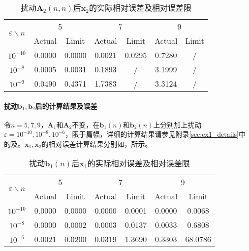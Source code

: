 \documentclass[12pt,a4paper]{article}
\begin{document}
\begin{table}
    \centering
    \caption{扰动$\boldsymbol{A}_2(n,n)$后$\boldsymbol{x}_2$的实际相对误差及相对误差限}
    \label{tab:ex1_err2}
    \begin{tabular}{c|cc|cc|cc}
        \toprule
        \multirow{2}{*}{\(\varepsilon \backslash n\)} & \multicolumn{2}{c}{5} & \multicolumn{2}{|c}{7} & \multicolumn{2}{|c}{9}\tabularnewline
        \cline{2-7}
        & Actual & Limit & Actual & Limit & Actual & Limit\tabularnewline
        \midrule
        \(10^{-10}\) & 0.0000 & 0.0000 & 0.0021 & 0.0295 & 0.7280 &
        /\tabularnewline
        \(10^{-8}\) & 0.0005 & 0.0031 & 0.1893 & / & 3.1999 & /\tabularnewline
        \(10^{-6}\) & 0.0490 & 0.4371 & 1.7383 & / & 3.3124 & /\tabularnewline
        \bottomrule
    \end{tabular}
\end{table}

\paragraph{扰动$\boldsymbol{b}_1,\boldsymbol{b}_2$后的计算结果及误差} 令$n=5,7,9$，$\boldsymbol{A}_1$和$\boldsymbol{A}_2$不变，在$\boldsymbol{b}_1(n)$和$\boldsymbol{b}_2(n)$上分别加上扰动$\varepsilon=10^{-10},10^{-8},10^{-6}$，限于篇幅，详细的计算结果请参见附录\ref{sec:ex1_details}中的及。$\boldsymbol{x}_1,\boldsymbol{x}_2$的相对误差计算结果分别如，所示。

\begin{table}
    \centering
    \caption{扰动$\boldsymbol{b}_1(n)$后$\boldsymbol{x}_1$的实际相对误差及相对误差限}
    \label{tab:ex1_b1_err}
    \begin{tabular}{c|cc|cc|cc}
        \toprule
        \multirow{2}{*}{\(\varepsilon \backslash n\)} & \multicolumn{2}{c}{5} & \multicolumn{2}{|c}{7} & \multicolumn{2}{|c}{9}\tabularnewline
        \cline{2-7}
        & Actual & Limit & Actual & Limit & Actual & Limit\tabularnewline
        \midrule
        \(10^{-10}\) & 0.0000 & 0.0000 & 0.0000 & 0.0001 & 0.0000 &
        0.0068\tabularnewline
        \(10^{-8}\) & 0.0000 & 0.0002 & 0.0003 & 0.0137 & 0.0033 &
        0.6808\tabularnewline
        \(10^{-6}\) & 0.0021 & 0.0200 & 0.0319 & 1.3690 & 0.3303 &
        68.0786\tabularnewline
        \bottomrule
    \end{tabular}
\end{table}
\end{document}
